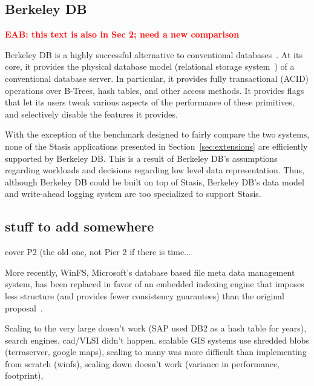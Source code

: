 \documentclass[letterpaper,twocolumn,10pt]{article}
\newcommand{\yad}{Stasis\xspace}
\newcommand{\eab}[1]{\textcolor{red}{\bf EAB: #1}}
\newcommand{\rcs}[1]{\textcolor{green}{\bf RCS: #1}}
\begin{document}

\subsection{Berkeley DB}

\eab{this text is also in Sec 2; need a new comparison}

Berkeley DB is a highly successful alternative to conventional
databases~\cite{libtp}.  At its core, it provides the physical database model
(relational storage system~\cite{systemR}) of a conventional database server.
In particular, 
it provides fully transactional (ACID) operations over B-Trees, 
hash tables, and other access methods.  It provides flags that 
let its users tweak various aspects of the performance of these
primitives, and selectively disable the features it provides.

With the
exception of the benchmark designed to fairly compare the two systems, none of the \yad 
applications presented in Section~\ref{sec:extensions} are efficiently
supported by Berkeley DB.   This is a result of Berkeley DB's  
assumptions regarding workloads and decisions regarding low level data
representation.  Thus, although Berkeley DB could be built on top of \yad,
Berkeley DB's data model and write-ahead logging system are too specialized to support \yad.


\subsection{stuff to add somewhere}

cover P2 (the old one, not Pier 2 if there is time...





More recently, WinFS, Microsoft's database based
file meta data management system, has been replaced in favor of an
embedded indexing engine that imposes less structure (and provides
fewer consistency guarantees) than the original
proposal~\cite{needtocitesomething}.

Scaling to the very large doesn't work (SAP used DB2 as a hash table
for years), search engines, cad/VLSI didn't happen.  scalable GIS
systems use shredded blobs (terraserver, google maps), scaling to many
was more difficult than implementing from scratch (winfs), scaling
down doesn't work (variance in performance, footprint),
\end{document}
